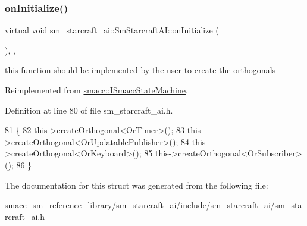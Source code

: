 \subsubsection{\texorpdfstring{on\+Initialize()}{onInitialize()}}
{\footnotesize\ttfamily virtual void sm\+\_\+starcraft\+\_\+ai\+::\+Sm\+Starcraft\+A\+I\+::on\+Initialize (\begin{DoxyParamCaption}{ }\end{DoxyParamCaption})\hspace{0.3cm}{\ttfamily [inline]}, {\ttfamily [override]}, {\ttfamily [virtual]}}



this function should be implemented by the user to create the orthogonals 



Reimplemented from \hyperlink{classsmacc_1_1ISmaccStateMachine_ac2982c6c8283663e5e1e8a7c82f511ec}{smacc\+::\+I\+Smacc\+State\+Machine}.



Definition at line 80 of file sm\+\_\+starcraft\+\_\+ai.\+h.


\begin{DoxyCode}
81     \{
82         this->createOrthogonal<OrTimer>();
83         this->createOrthogonal<OrUpdatablePublisher>();
84         this->createOrthogonal<OrKeyboard>();
85         this->createOrthogonal<OrSubscriber>();
86     \}
\end{DoxyCode}


The documentation for this struct was generated from the following file\+:\begin{DoxyCompactItemize}
\item 
smacc\+\_\+sm\+\_\+reference\+\_\+library/sm\+\_\+starcraft\+\_\+ai/include/sm\+\_\+starcraft\+\_\+ai/\hyperlink{sm__starcraft__ai_8h}{sm\+\_\+starcraft\+\_\+ai.\+h}\end{DoxyCompactItemize}
